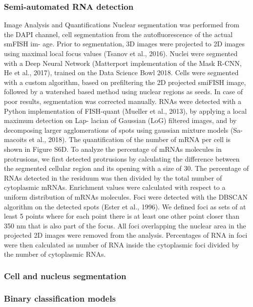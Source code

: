 \subsubsection{Semi-automated RNA detection}

Image Analysis and Quantifications
Nuclear segmentation was performed from the DAPI channel, cell segmentation from the autofluorescence of the actual smFISH im- age. Prior to segmentation, 3D images were projected to 2D images using maximal local focus values (Tsanov et al., 2016). Nuclei were segmented with a Deep Neural Network (Matterport implementation of the Mask R-CNN, He et al., 2017), trained on the Data Science Bowl 2018. Cells were segmented with a custom algorithm, based on prefiltering the 2D projected smiFISH image, followed by a watershed based method using nuclear regions as seeds. In case of poor results, segmentation was corrected manually. RNAs were detected with a Python implementation of FISH-quant (Mueller et al., 2013), by applying a local maximum detection on Lap- lacian of Gaussian (LoG) filtered images, and by decomposing larger agglomerations of spots using gaussian mixture models (Sa- macoits et al., 2018). The quantification of the number of mRNA per cell is shown in Figure S6D.
To analyze the percentage of mRNAs molecules in protrusions, we first detected protrusions by calculating the difference between the segmented cellular region and its opening with a size of 30. The percentage of RNAs detected in the residuum was then divided by the total number of cytoplasmic mRNAs. Enrichment values were calculated with respect to a uniform distribution of mRNAs molecules.
Foci were detected with the DBSCAN algorithm on the detected spots (Ester et al., 1996). We defined foci as sets of at least 5 points where for each point there is at least one other point closer than 350 nm that is also part of the focus. All foci overlapping the nuclear area in the projected 2D images were removed from the analysis. Percentages of RNA in foci were then calculated as number of RNA inside the cytoplasmic foci divided by the number of cytoplasmic RNAs.

\subsubsection{Cell and nucleus segmentation}

\subsubsection{Binary classification models}

